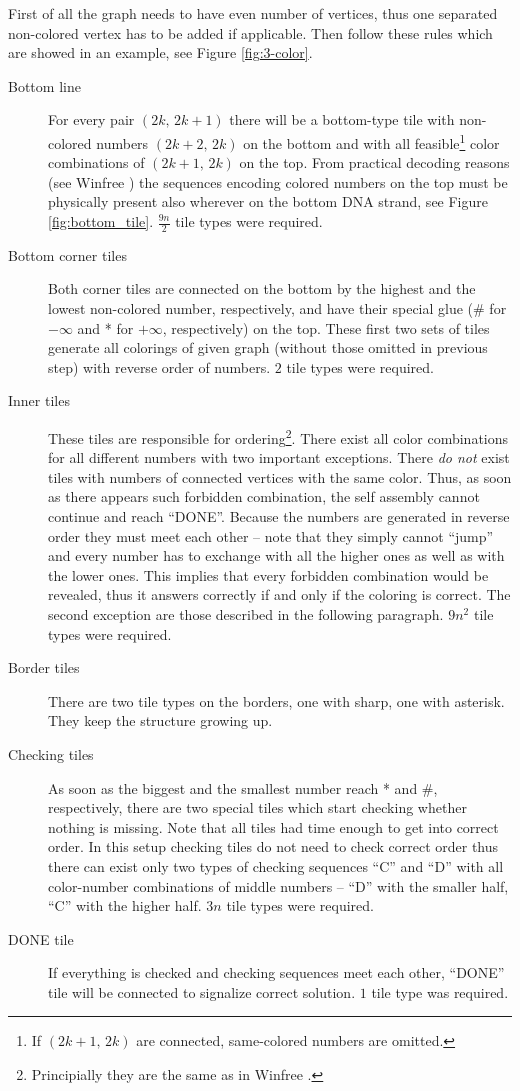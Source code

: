 First of all the graph needs to have even number of vertices, thus one separated non-colored vertex has to be added if applicable. Then follow these rules which are showed in an example, see Figure \ref{fig:3-color}.
\begin{description}
	\item[Bottom line] For every pair $(2k,\,2k+1)$ there will be a bottom-type tile with non-colored numbers $(2k+2,\,2k)$ on the bottom and with all feasible\footnote{If $(2k+1,\,2k)$ are connected, same-colored numbers are omitted.} color combinations of $(2k+1,\,2k)$ on the top. From practical decoding reasons (see Winfree \cite{winfree_phd}) the sequences encoding colored numbers on the top must be physically present also wherever on the bottom DNA strand, see Figure \ref{fig:bottom_tile}. $\frac{9n}{2}$ tile types were required.
	\item[Bottom corner tiles] Both corner tiles are connected on the bottom by the highest and the lowest non-colored number, respectively, and have their special glue (\# for $-\infty$ and * for $+\infty$, respectively) on the top. These first two sets of tiles generate all colorings of given graph (without those omitted in previous step) with reverse order of numbers. $2$ tile types were required.
	\item[Inner tiles] These tiles are responsible for ordering\footnote{Principially they are the same as in Winfree \cite{winfree_phd}.}. There exist all color combinations for all different numbers with two important exceptions. There {\em do not} exist tiles with numbers of connected vertices with the same color. Thus, as soon as there appears such forbidden combination, the self assembly cannot continue and reach ``DONE''. Because the numbers are generated in reverse order they must meet each other -- note that they simply cannot ``jump'' and every number has to exchange with all the higher ones as well as with the lower ones. This implies that every forbidden combination would be revealed, thus it answers correctly if and only if the coloring is correct. The second exception are those described in the following paragraph. $9n^2$ tile types were required.
	\item[Border tiles] There are two tile types on the borders, one with sharp, one with asterisk. They keep the structure growing up.
	\item[Checking tiles] As soon as the biggest and the smallest number reach * and \#, respectively, there are two special tiles which start checking whether nothing is missing. Note that all tiles had time enough to get into correct order. In this setup checking tiles do not need to check correct order thus there can exist only two types of checking sequences ``C'' and ``D'' with all color-number combinations of middle numbers -- ``D'' with the smaller half, ``C'' with the higher half. $3n$ tile types were required.
	\item[DONE tile] If everything is checked and checking sequences meet each other, ``DONE'' tile will be connected to signalize correct solution. $1$ tile type was required.
\end{description}

